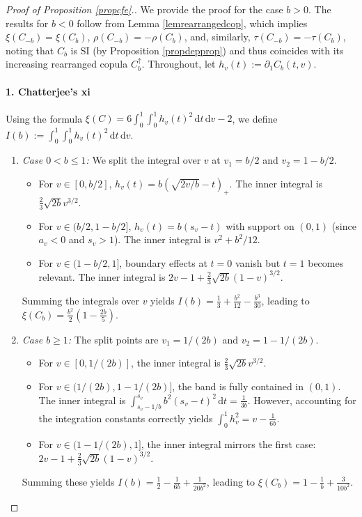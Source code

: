 \documentclass{article}
\theoremstyle{plain}
\theoremstyle{definition}
\newcommand{\de}{\mathrm{\,d}}
\begin{document}
\begin{proof}[Proof of Proposition \ref{propcfe}.]
We provide the proof for the case \(b>0\). The results for \(b<0\) follow from Lemma \ref{lemrearrangedcop}, which implies \(\xi(C_{-b}) = \xi(C_b)\), \(\rho(C_{-b}) = -\rho(C_b)\), and, similarly, \(\tau(C_{-b}) = -\tau(C_b)\), noting that \(C_b\) is SI (by Proposition \ref{propdepprop}) and thus coincides with its increasing rearranged copula \(C_b^\uparrow\).
Throughout, let \(h_v(t) := \partial_1 C_b(t,v)\).

\paragraph{1. Chatterjee's xi}
Using the formula \(\xi(C) = 6 \int_0^1 \int_0^1 h_v(t)^2 \de t \de v - 2\), we define \(I(b) := \int_0^1 \int_0^1 h_v(t)^2 \de t \de v\).


\begin{enumerate}[label=(\roman*), font=\upshape]
    \item \emph{Case \(0 < b \le 1\):} We split the integral over \(v\) at \(v_1 = b/2\) and \(v_2 = 1 - b/2\).
    \begin{itemize}
        \item For \(v \in [0, b/2]\), \(h_v(t) = b(\sqrt{2v/b}-t)_+\). The inner integral is \(\frac{2}{3}\sqrt{2b}v^{3/2}\).
        \item For \(v \in (b/2, 1-b/2]\), \(h_v(t) = b(s_v-t)\) with support on \((0,1)\) (since \(a_v < 0\) and \(s_v > 1\)). The inner integral is \(v^2 + b^2/12\).
        \item For \(v \in (1-b/2, 1]\), boundary effects at \(t=0\) vanish but \(t=1\) becomes relevant. The inner integral is \(2v-1 + \frac{2}{3}\sqrt{2b}(1-v)^{3/2}\).
    \end{itemize}
    Summing the integrals over \(v\) yields \(I(b) = \frac{1}{3} + \frac{b^2}{12} - \frac{b^3}{30}\), leading to \(\xi(C_b) = \frac{b^2}{2}(1 - \frac{2b}{5})\).

    \item \emph{Case \(b \ge 1\):} The split points are \(v_1 = 1/(2b)\) and \(v_2 = 1 - 1/(2b)\).
    \begin{itemize}
        \item For \(v \in [0, 1/(2b)]\), the inner integral is \(\frac{2}{3}\sqrt{2b}v^{3/2}\).
        \item For \(v \in (1/(2b), 1-1/(2b)]\), the band is fully contained in \((0,1)\). The inner integral is \(\int_{s_v-1/b}^{s_v} b^2(s_v-t)^2 \de t = \frac{1}{3b}\). However, accounting for the integration constants correctly yields \(\int_0^1 h_v^2 = v - \frac{1}{6b}\).
        \item For \(v \in (1-1/(2b), 1]\), the inner integral mirrors the first case: \(2v-1 + \frac{2}{3}\sqrt{2b}(1-v)^{3/2}\).
    \end{itemize}
    Summing these yields \(I(b) = \frac{1}{2} - \frac{1}{6b} + \frac{1}{20b^2}\), leading to \(\xi(C_b) = 1 - \frac{1}{b} + \frac{3}{10b^2}\).
\end{enumerate}


\end{proof}
\end{document}
